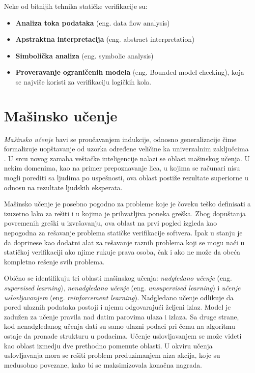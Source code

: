 \documentclass[a4paper]{article}
\theoremstyle{definition}
\begin{document}
{Neke od bitnijih tehnika statičke verifikacije su:
\begin{itemize}
\item \textbf{Analiza toka podataka} (eng. data flow analysis)
\item \textbf{Apstraktna interpretacija} (eng. abstract interpretation)
\item \textbf{Simbolička analiza} (eng. symbolic analysis)
\item \textbf{Proveravanje ograničenih modela} (eng. Bounded model checking), koja se najviše koristi za verifikaciju logičkih kola.
\end{itemize}


\section{Mašinsko učenje}



\textit{Mašinsko učenje} bavi se proučavanjem indukcije, odnosno generalizacije 
čime formalizuje uopštavanje od uzorka određene veličine ka univerzalnim zaključcima \cite{bishopML}.
U srcu novog zamaha veštačke inteligencije nalazi se oblast mašinskog učenja. 
U nekim domenima, kao na primer prepoznavanje lica, u kojima se računari nisu 
mogli porediti sa ljudima po uspešnosti, ova oblast postiže rezultate superiorne 
u odnosu na rezultate ljudskih eksperata.


Mašinsko učenje je posebno pogodno za probleme koje je čoveku teško definisati a 
izuzetno lako za rešiti i u kojima je prihvatljiva poneka greška. Zbog dopuštanja 
povremenih greški u izvršavanju, ova oblast na prvi pogled izgleda kao nepogodna 
za rešavanje problema statičke verifikacije softvera. Ipak u stanju je da doprinese 
kao dodatni alat za rešavanje raznih problema koji se mogu naći u statičkoj 
verifikaciji ako njime rukuje prava osoba, čak i ako ne može da obeća kompletno 
rešenje svih problema.

Obično se identifikuju tri oblasti mašinskog učenja: 
\textit{nadgledano učenje} (eng. \emph{supervised learning}), 
\textit{nenadgledano učenje} (eng. \emph{unsupervised learning}) i 
\textit{učenje uslovljavanjem} (eng. \emph{reinforcement learning}). 
Nadgledano učenje odlikuje da pored ulaznih podataka 
postoji i njemu odgovarajući željeni izlaz. Model je zadužen za učenje pravila nad 
datim parovima ulaza i izlaza. Sa druge strane, kod nenadgledanog učenja dati su 
samo ulazni podaci pri čemu na algoritmu ostaje da pronađe strukturu u podacima. 
Učenje uslovljavanjem se može videti kao oblast izmedju dve prethodno pomenute oblasti.
U okviru učenja uslovljavanja mora se rešiti problem preduzimanjem niza akcija,
koje su međusobno povezane, kako bi se maksimizovala konačna nagrada.

}
\end{document}
